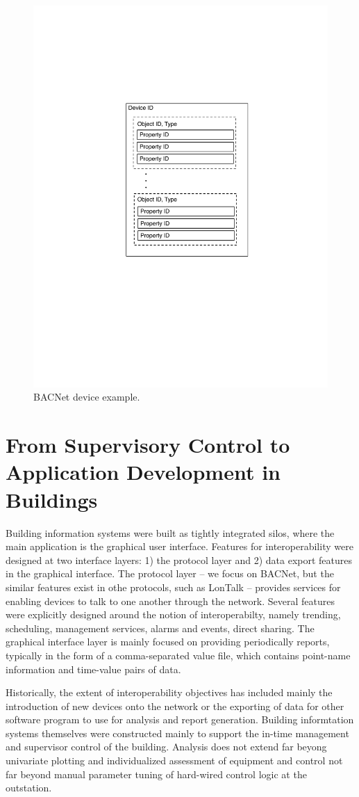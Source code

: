 \begin{figure}[t!] %
\centering
\includegraphics[width=0.25\columnwidth]{figs/bacnet_device}
\caption{BACNet device example.}
\label{fig:bacnet_device}
\end{figure}

\section{From Supervisory Control to Application Development in Buildings}
Building information systems were built as tightly integrated silos, where the main application is the graphical user interface.
Features for interoperability were designed at two interface layers: 1) the protocol layer and 2) data export features in the 
graphical interface.  The protocol layer -- we focus on BACNet, but the similar features exist in othe protocols, such as LonTalk --
provides services for enabling devices to talk to one another through the network.  Several features were explicitly designed around
the notion of interoperabilty, namely trending, scheduling, management services, alarms and events, direct sharing.  The graphical
interface layer is mainly focused on providing periodically reports, typically in the form of a comma-separated value file, which
contains point-name information and time-value pairs of data.

Historically, the extent of interoperability objectives has included mainly the introduction of new devices onto the network or
the exporting of data for other software program to use for analysis and report generation.  Building informtation systems themselves
were constructed mainly to support the in-time management and supervisor control of the building.  Analysis does not 
extend far beyong univariate plotting and individualized assessment of equipment and control not far beyond manual parameter tuning
of hard-wired control logic at the outstation.

